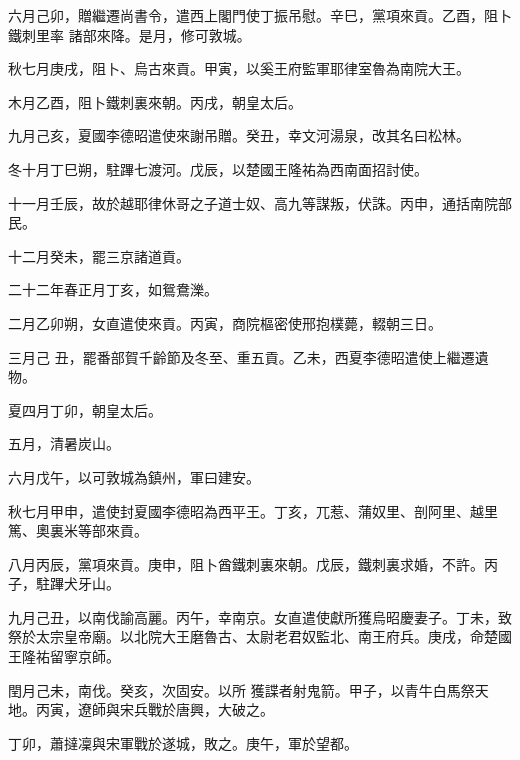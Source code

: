 \begin{pinyinscope}
 六月己卯，贈繼遷尚書令，遣西上閣門使丁振吊慰。辛巳，黨項來貢。乙酉，阻卜鐵刺里率
 諸部來降。是月，修可敦城。



 秋七月庚戌，阻卜、烏古來貢。甲寅，以奚王府監軍耶律室魯為南院大王。



 木月乙酉，阻卜鐵刺裏來朝。丙戌，朝皇太后。



 九月己亥，夏國李德昭遣使來謝吊贈。癸丑，幸文河湯泉，改其名曰松林。



 冬十月丁巳朔，駐蹕七渡河。戊辰，以楚國王隆祐為西南面招討使。



 十一月壬辰，故於越耶律休哥之子道士奴、高九等謀叛，伏誅。丙申，通括南院部民。



 十二月癸未，罷三京諸道貢。



 二十二年春正月丁亥，如鴛鴦濼。



 二月乙卯朔，女直遣使來貢。丙寅，商院樞密使邢抱樸薨，輟朝三日。



 三月己
 丑，罷番部賀千齡節及冬至、重五貢。乙未，西夏李德昭遣使上繼遷遺物。



 夏四月丁卯，朝皇太后。



 五月，清暑炭山。



 六月戊午，以可敦城為鎮州，軍曰建安。



 秋七月甲申，遣使封夏國李德昭為西平王。丁亥，兀惹、蒲奴里、剖阿里、越里篤、奧裏米等部來貢。



 八月丙辰，黨項來貢。庚申，阻卜酋鐵刺裏來朝。戊辰，鐵刺裏求婚，不許。丙子，駐蹕犬牙山。



 九月己丑，以南伐諭高麗。丙午，幸南京。女直遣使獻所獲烏昭慶妻子。丁未，致祭於太宗皇帝廟。以北院大王磨魯古、太尉老君奴監北、南王府兵。庚戌，命楚國王隆祐留寧京師。



 閏月己未，南伐。癸亥，次固安。以所
 獲諜者射鬼箭。甲子，以青牛白馬祭天地。丙寅，遼師與宋兵戰於唐興，大破之。



 丁卯，蕭撻凜與宋軍戰於遂城，敗之。庚午，軍於望都。




\end{pinyinscope}
